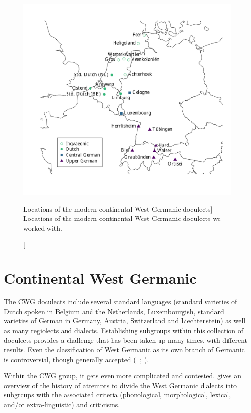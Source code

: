 \documentclass[a4paper]{article}
\begin{document}
\begin{figure}[h]
\centering
\includegraphics[width=\textwidth]{figures/map.pdf}
\caption
[Locations of the modern continental West Germanic doculects]
{Locations of the modern continental West Germanic doculects we worked with.}
\label{fig:map}
\end{figure}


\section{Continental West Germanic}
\label{sec:cwg}

The CWG doculects include several standard languages
(standard varieties of Dutch spoken in Belgium and the Netherlands,
Luxembourgish, standard varieties of German in
Germany, Austria, Switzerland and Liechtenstein)
as well as many regiolects and dialects.
Establishing subgroups within this collection of doculects provides a challenge
that has been taken up many times, with different results.
Even the classification of West Germanic
as its own branch of Germanic is controversial,
though generally accepted
(\citet{voyles1971problem}; \citet[pp. 7-8]{harbert2007germanic}; \citet{ringe2012cladistic}).

Within the CWG group, it gets even more complicated and contested.
\citet[pp. 72-80]{nielsen1989germanic} gives an overview of the history of attempts to divide the West Germanic dialects into subgroups with the associated criteria (phonological, morphological, lexical, and/or extra-linguistic) and criticisms.
\end{document}

